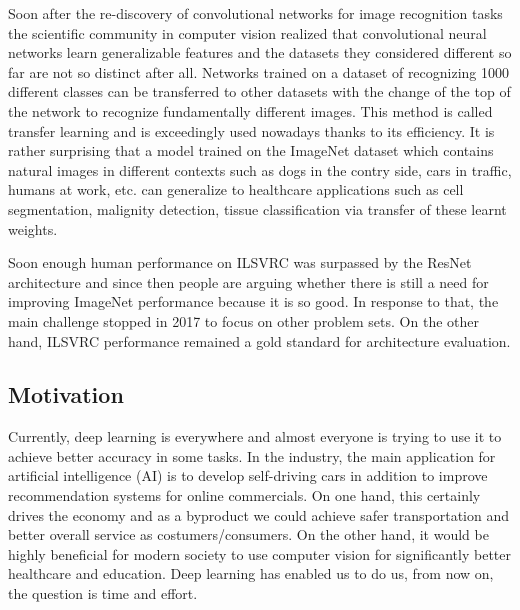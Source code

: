 \documentclass[a4paper,12pt]{article}
\begin{document}
\vspace{4mm}

\par Soon after the re-discovery of convolutional networks for image recognition tasks the scientific community in computer vision realized that convolutional neural networks learn generalizable features and the datasets they considered different so far are not so distinct after all. Networks trained on a dataset of recognizing 1000 different classes can be transferred to other datasets with the change of the top of the network to recognize fundamentally different images. This method is called transfer learning and is exceedingly used nowadays thanks to its efficiency. It is rather surprising that a model trained on the ImageNet dataset which contains natural images in different contexts such as dogs in the contry side, cars in traffic, humans at work, etc. can generalize to healthcare applications such as cell segmentation, malignity detection, tissue classification via transfer of these learnt weights. 

\vspace{4mm}

\par Soon enough human performance on ILSVRC was surpassed \cite{he2016deep} by the ResNet architecture and since then people are arguing whether there is still a need for improving ImageNet performance because it is so good. In response to that, the main challenge stopped in 2017 to focus on other problem sets. On the other hand, ILSVRC performance remained a gold standard for architecture evaluation. 

\vspace{7mm}

\subsection{Motivation}

\vspace{7mm}

Currently, deep learning is everywhere and almost everyone is trying to use it to achieve better accuracy in some tasks. In the industry, the main application for artificial intelligence (AI) is to develop self-driving cars in addition to improve recommendation systems for online commercials. On one hand, this certainly drives the economy and as a byproduct we could achieve safer transportation and better overall service as costumers/consumers. On the other hand, it would be highly beneficial for modern society to use computer vision for significantly better healthcare and education. Deep learning has enabled us to do us, from now on, the question is time and effort.
\end{document}
